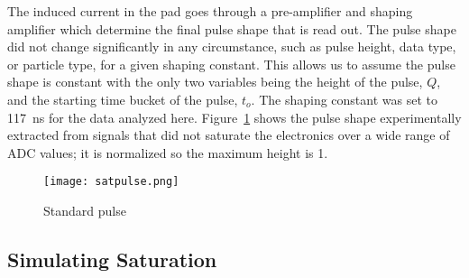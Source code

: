 The induced current in the pad goes through a pre-amplifier and shaping amplifier which determine the final pulse shape that is read out. The pulse shape did not change significantly in any circumstance, such as pulse height, data type, or particle type, for a given shaping constant. This allows us to assume the pulse shape is constant with the only two variables being the height of the pulse, $Q$, and the starting time bucket of the pulse, $t_o$. The shaping constant was set to \SI{117}{\nano\second} for the data analyzed here. Figure~\ref{fig:pulseshape} shows the pulse shape experimentally extracted from signals that did not saturate the electronics over a wide range of ADC values; it is normalized so the maximum height is 1. 



\begin{figure}[!htb]
    \centering       
    \texttt{[image: satpulse.png]} 
    \caption{Standard pulse }
    \label{fig:pulseshape}
\end{figure}


\subsection{Simulating Saturation}



